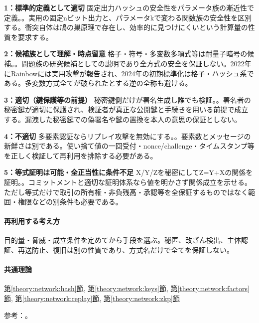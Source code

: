 \noindent\textbf{1：標準的定義として適切} 固定出力ハッシュの安全性をパラメータ族の漸近性で定義。。実用の固定nビット出力と、パラメータkで変わる関数族の安全性を区別する。衝突自体は鳩の巣原理で存在し、効率的に見つけにくいという計算量の性質を要求する。\par

\noindent\textbf{2：候補族として理解・時点留意} 格子・符号・多変数多項式等は耐量子暗号の候補。。問題族の研究候補としての説明であり全方式の安全を保証しない。2022年にRainbowには実用攻撃が報告され、2024年の初期標準化は格子・ハッシュ系である。多変数方式全てが破られたとする逆の全称も避ける。\par

\noindent\textbf{3：適切（鍵保護等の前提）} 秘密鍵側だけが署名生成し誰でも検証。。署名者の秘密鍵が適切に保護され、検証者が真正な公開鍵と手続きを用いる前提で成立する。漏洩した秘密鍵での偽署名や鍵の置換を本人の意思の保証としない。\par

\noindent\textbf{4：不適切} 多要素認証ならリプレイ攻撃を無効にする。。要素数とメッセージの新鮮さは別である。使い捨て値の一回受付・nonce/challenge・タイムスタンプ等を正しく検証して再利用を排除する必要がある。\par

\noindent\textbf{5：等式証明は可能・全正当性に条件不足} X/Y/Zを秘密にしてZ=\allowbreak{}Y+Xの関係を証明。。コミットメントと適切な証明体系なら値を明かさず関係成立を示せる。ただし等式だけで取引の所有権・非負残高・承認等を全保証するものではなく範囲・権限などの別条件も必要である。\par

\paragraph{再利用する考え方} 目的量・脅威・成立条件を定めてから手段を選ぶ。秘匿、改ざん検出、主体認証、再送防止、復旧は別の性質であり、方式名だけで全てを保証しない。

\paragraph{共通理論} \hyperref[theory:network:hash]{第\ref*{theory:network:hash}節}, \hyperref[theory:network:keys]{第\ref*{theory:network:keys}節}, \hyperref[theory:network:factors]{第\ref*{theory:network:factors}節}, \hyperref[theory:network:replay]{第\ref*{theory:network:replay}節}, \hyperref[theory:network:zkp]{第\ref*{theory:network:zkp}節}

\par 参考：\cite{net_hash,net_nist2017,net_signature,net_pq2024,net_pq2022,net_zkp2021}。

